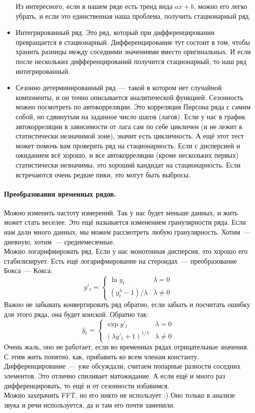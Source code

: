 \documentclass{article}
\begin{document}
\begin{itemize}
        Из интересного, если в нашем ряде есть тренд вида $ax+b$, можно его легко убрать, и если это единственная наша проблема, получить стационарный ряд.
        \item Интегрированный ряд. Это ряд, который при дифференцировании превращается в стационарный. Дифференцирование тут состоит в том, чтобы хранить разницы между соседними значениями вместо оригинальных. И если после нескольких дифференцирований получится стационарный, то наш ряд интегрированный.
        \item Сезонно детерминированный ряд~--- такой в котором нет случайной компоненты, и он точно описывается аналитической функцией. Сезонность можно посмотреть по автокорреляции. Это корреляция Пирсона ряда с самим собой, но сдвинутым на заданное число шагов (лагов). Если у нас в график автокорреляции в зависимости от лага сам по себе цикличен (и не лежит в статистически незначимой зоне), значит есть цикличность. А ещё этот тест может помочь вам проверить ряд на стационарность. Если с дисперсией и ожиданием всё хорошо, и все автокорреляции (кроме нескольких первых) статистически незначимы, это хороший кандидат на стационарность. Если встречаются очень редкие пики, это могут быть выбросы.
    \end{itemize}
    \paragraph{Преобразования временных рядов.}
    Можно изменить частоту измерений. Так у нас будет меньше данных, и жить может стать веселее. Это ещё называется изменением гранулярности ряда. Если нам дали много данных, мы можем рассмотреть любую гранулярность. Хотим~--- дневную, хотим~--- среднемесячные.\\
    Можно логарифмировать ряд. Если у нас монотонная дисперсия, это хорошо его стабилизирует. Есть ещё логарифмирование на стероидах~--- преобразование Бокса~--- Кокса:
    \[
    y'_t=\begin{cases}
        \ln y_t & \lambda=0\\
        (y_t^\lambda-1)/\lambda & \lambda\neq0
    \end{cases}
    \]
    Важно не забывать конвертировать ряд обратно, если забыть и посчитать ошибку для этого ряда, она будет конской. Обратно так:
    \[
    \hat y_t=\begin{cases}
        \exp y'_t & \lambda=0\\
        (\lambda y'_t+1)^{1/\lambda} & \lambda\neq0
    \end{cases}
    \]
    Очень жаль, оно не работает, если во временных рядах отрицательные значения. С этим жить понятно, как, прибавить ко всем членам константу.\\
    Дифференцирование~--- уже обсуждали, считаем попарные разности соседних элементов. Это отлично спиливает матожидание. А если ещё и много раз дифференцировать, то ещё и от сезонности избавимся.\\
    Можно захерачить FFT, но его никто не использует :) Оно только в анализе звука и речи используется, да и там его почти заменили.
\end{document}

